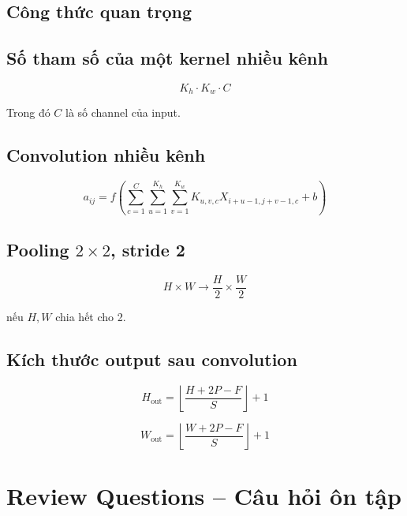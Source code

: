 \subsection{Công thức quan trọng}

\subsection*{Số tham số của một kernel nhiều kênh}

\[
    K_h \cdot K_w \cdot C
\]

Trong đó $C$ là số channel của input.

\subsection*{Convolution nhiều kênh}

\[
    a_{ij}
    =
    f
    \left(
    \sum_{c=1}^{C}
    \sum_{u=1}^{K_h}
    \sum_{v=1}^{K_w}
    K_{u,v,c}
    X_{i+u-1,j+v-1,c}
    +
    b
    \right)
\]

\subsection*{Pooling $2\times2$, stride 2}

\[
    H\times W
    \rightarrow
    \frac{H}{2}\times \frac{W}{2}
\]

nếu $H,W$ chia hết cho 2.

\subsection*{Kích thước output sau convolution}

\[
    H_{\text{out}}
    =
    \left\lfloor
    \frac{H+2P-F}{S}
    \right\rfloor
    +1
\]

\[
    W_{\text{out}}
    =
    \left\lfloor
    \frac{W+2P-F}{S}
    \right\rfloor
    +1
\]

\section{Review Questions -- Câu hỏi ôn tập}

